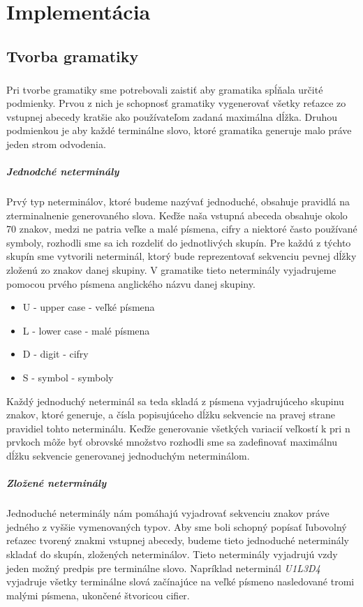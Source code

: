 \chapter{Implementácia}

\section{Tvorba gramatiky}
\paragraph{}
Pri tvorbe gramatiky sme potrebovali zaistiť aby gramatika spĺňala určité podmienky. Prvou z nich je schopnosť gramatiky vygenerovať všetky reťazce zo vstupnej abecedy kratšie ako používateľom zadaná maximálna dĺžka. Druhou podmienkou je aby každé terminálne slovo, ktoré gramatika generuje malo práve jeden strom odvodenia.

\paragraph{Jednodché neterminály}
Prvý typ neterminálov, ktoré budeme nazývať jednoduché, obsahuje pravidlá na zterminalnenie generovaného slova. Keďže naša vstupná abeceda obsahuje okolo 70 znakov, medzi ne patria veľke a malé písmena, cifry a niektoré často používané symboly, rozhodli sme sa ich rozdeliť do jednotlivých skupín. Pre každú z týchto skupín sme vytvorili neterminál, ktorý bude reprezentovať sekvenciu pevnej dĺžky zloženú zo znakov danej skupiny. V gramatike tieto neterminály vyjadrujeme pomocou prvého písmena anglického názvu danej skupiny.
\begin{itemize}
	\item U - upper case - veľké písmena
	\item L - lower case - malé písmena
	\item D - digit - cifry
	\item S - symbol - symboly
\end{itemize}
Každý jednoduchý neterminál sa teda skladá z písmena vyjadrujúceho skupinu znakov, ktoré generuje, a čísla popisujúceho dĺžku sekvencie na pravej strane pravidiel tohto neterminálu. Keďže generovanie všetkých variacií veľkostí k pri n prvkoch môže byť obrovské množstvo rozhodli sme sa zadefinovať maximálnu dĺžku sekvencie generovanej jednoduchým neterminálom.
\paragraph{Zložené neterminály}
Jednoduché neterminály nám pomáhajú vyjadrovať sekvenciu znakov práve jedného z vyššie vymenovaných typov. Aby sme boli schopný popísať ľubovolný reťazec tvorený znakmi vstupnej abecedy, budeme tieto jednoduché neterminály skladať do skupín, zložených neterminálov. Tieto neterminály vyjadrujú vzdy jeden možný predpis pre terminálne slovo. Napríklad neterminál \emph{U1L3D4} vyjadruje všetky terminálne slová začínajúce na veľké písmeno nasledované tromi malými písmena, ukončené štvoricou cifier.
